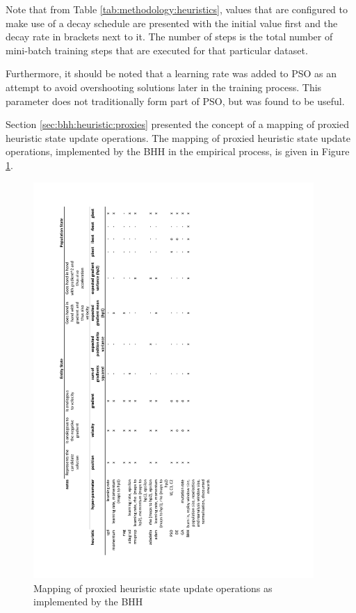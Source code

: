 Note that from Table \ref{tab:methodology:heuristics}, values that are configured to make use of a decay schedule are presented with the initial value first and the decay rate in brackets next to it. The number of steps is the total number of mini-batch training steps that are executed for that particular dataset.

Furthermore, it should be noted that a learning rate was added to \acs{PSO} as an attempt to avoid overshooting solutions later in the training process. This parameter does not traditionally form part of \acs{PSO}, but was found to be useful.

Section \ref{sec:bhh:heuristic:proxies} presented the concept of a mapping of proxied heuristic state update operations. The mapping of proxied heuristic state update operations, implemented by the \acs{BHH} in the empirical process, is given in Figure \ref{fig:methodology:heuristics:proxies}.


\begin{figure}[htbp]
      \centering
      \includegraphics[width=0.95\textwidth]{images/bhh_heuristic_proxies.pdf}
      \caption{Mapping of proxied heuristic state update operations as implemented by the \acs{BHH}}
      \label{fig:methodology:heuristics:proxies}%
\end{figure}



